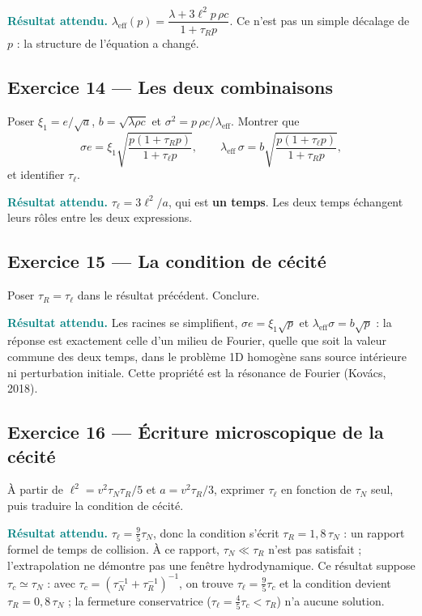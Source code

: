\documentclass[11pt,a4paper]{article}
\newcommand{\rep}[1]{\par\smallskip\noindent\textcolor{teal}{\textbf{Résultat attendu.}}\; #1\par\smallskip}
\begin{document}
\rep{$\lambda_{\mathrm{eff}}(p) = \dfrac{\lambda + 3\ell^2 p\,\rho c}{1 + \tau_R p}$. Ce n'est pas un
simple décalage de $p$ : la structure de l'équation a changé.}

\subsection*{Exercice 14 --- Les deux combinaisons}

Poser $\xi_1 = e/\sqrt{a}$, $b = \sqrt{\lambda\rho c}$ et $\sigma^2 = p\,\rho c/\lambda_{\mathrm{eff}}$.
Montrer que
\[ \sigma e = \xi_1\sqrt{\frac{p(1+\tau_R p)}{1+\tau_\ell p}} , \qquad
\lambda_{\mathrm{eff}}\,\sigma = b\sqrt{\frac{p(1+\tau_\ell p)}{1+\tau_R p}} , \]
et identifier $\tau_\ell$.

\rep{$\tau_\ell = 3\ell^2/a$, qui est \textbf{un temps}. Les deux temps échangent leurs rôles entre
les deux expressions.}

\subsection*{Exercice 15 --- La condition de cécité}

Poser $\tau_R = \tau_\ell$ dans le résultat précédent. Conclure.

\rep{Les racines se simplifient, $\sigma e = \xi_1\sqrt{p}$ et
$\lambda_{\mathrm{eff}}\sigma = b\sqrt{p}$ : la réponse est exactement celle d'un milieu de Fourier,
quelle que soit la valeur commune des deux temps, dans le problème 1D homogène sans source intérieure ni perturbation initiale. Cette propriété est la résonance de Fourier (Kovács, 2018).}

\subsection*{Exercice 16 --- Écriture microscopique de la cécité}

À partir de $\ell^2 = v^2\tau_N\tau_R/5$ et $a = v^2\tau_R/3$, exprimer $\tau_\ell$ en fonction de
$\tau_N$ seul, puis traduire la condition de cécité.

\rep{$\tau_\ell = \tfrac{9}{5}\tau_N$, donc la condition s'écrit $\tau_R = 1{,}8\,\tau_N$ : un
rapport formel de temps de collision. À ce rapport, $\tau_N\ll\tau_R$ n'est pas satisfait ; l'extrapolation ne démontre pas une fenêtre hydrodynamique.
Ce résultat suppose $\tau_c\simeq\tau_N$ : avec $\tau_c=(\tau_N^{-1}+\tau_R^{-1})^{-1}$, on trouve $\tau_\ell=\tfrac95\tau_c$ et la condition devient $\tau_R=0{,}8\,\tau_N$ ; la fermeture conservatrice ($\tau_\ell=\tfrac45\tau_c<\tau_R$) n'a aucune solution.}
\end{document}
